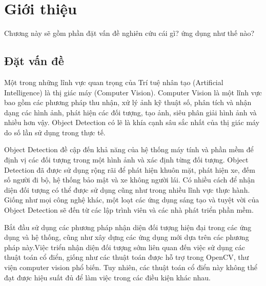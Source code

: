 \documentclass[12pt,twoside,a4paper]{article}
\begin{document}


\pagebreak

\large



\pagebreak

\makeatletter
\renewcommand\thesection{Chương \arabic{section}:}
\renewcommand\thesubsection{\arabic{section}.\arabic{subsection}.}
\renewcommand\thesubsubsection{\thesubsection\arabic{subsubsection}.}
\makeatother


\section{Giới thiệu}
Chương này sẽ gồm phần đặt vấn đề nghiên cứu cái gì? ứng dụng như thế nào?
\subsection{Đặt vấn đề}
Một trong những lĩnh vực quan trọng của Trí tuệ nhân tạo (Artificial Intelligence) là thị giác máy (Computer Vision). Computer Vision là một lĩnh vực bao gồm các phương pháp thu nhận, xử lý ảnh kỹ thuật số, phân tích và nhận dạng các hình ảnh, phát hiện các đối tượng, tạo ảnh, siêu phân giải hình ảnh và nhiều hơn vậy. Object Detection có lẽ là khía cạnh sâu sắc nhất của thị giác máy do số lần sử dụng trong thực tế.

Object Detection đề cập đến khả năng của hệ thống máy tính và phần mềm để định vị các đối tượng trong một hình ảnh và xác định từng đối tượng. Object Detection đã được sử dụng rộng rãi để phát hiện khuôn mặt, phát hiện xe, đếm số người đi bộ, hệ thống bảo mật và xe không người lái. Có nhiều cách để nhận diện đối tượng có thể được sử dụng cũng như trong nhiều lĩnh vực thực hành. Giống như mọi công nghệ khác, một loạt các ứng dụng sáng tạo và tuyệt vời của Object Detection sẽ đến từ các lập trình viên và các nhà phát triển phần mềm.

Bắt đầu sử dụng các phương pháp nhận diện đối tượng hiện đại trong các ứng dụng và hệ thống, cũng như xây dựng các ứng dụng mới dựa trên các phương pháp này.Việc triển nhận diện đối tượng sớm liên quan đến việc sử dụng các thuật toán cổ điển, giống như các thuật toán được hỗ trợ trong OpenCV, thư viện computer vision phổ biến. Tuy nhiên, các thuật toán cổ điển này không thể đạt được hiệu suất đủ để làm việc trong các điều kiện khác nhau.
\end{document}
